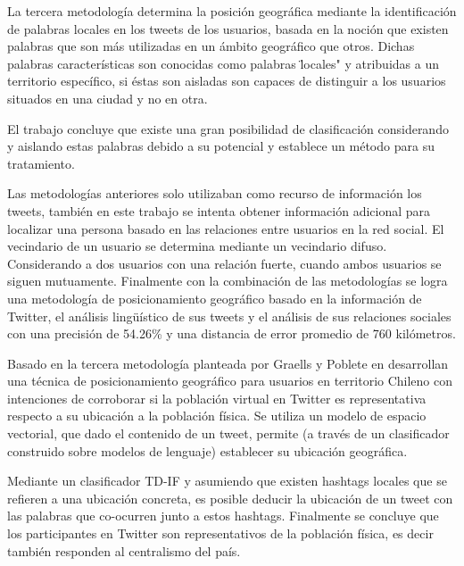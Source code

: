 La tercera metodología determina la posición geográfica mediante la identificación de palabras locales en los tweets de los usuarios, basada en la noción que existen palabras que son más utilizadas en un ámbito geográfico que otros. Dichas palabras características son conocidas como palabras  \"locales" y atribuidas a un territorio específico, si éstas son aisladas son capaces de distinguir a los usuarios situados en una ciudad y no en otra. 

El trabajo concluye que existe una gran posibilidad de clasificación considerando y aislando estas palabras debido a su potencial y establece un método para su tratamiento. 

Las metodologías anteriores solo utilizaban como recurso de información los tweets, también en este trabajo se intenta obtener información adicional para localizar una persona basado en las relaciones entre usuarios en la red social. El vecindario de un usuario se determina mediante un vecindario difuso. Considerando a dos usuarios con una relación fuerte, cuando ambos usuarios se siguen mutuamente. Finalmente con la combinación de las metodologías se logra una metodología de posicionamiento geográfico basado en la información de Twitter, el análisis lingüístico de sus tweets y el análisis de sus relaciones sociales con una precisión de 54.26\% y una distancia de error promedio de 760 kilómetros.

Basado en la tercera metodología planteada por  \cite{Cheng:2010:YYT:1871437.1871535}  Graells y Poblete en \cite{GraellsGarridoP13} desarrollan una técnica de posicionamiento geográfico para usuarios en territorio Chileno con intenciones de corroborar si la población virtual en Twitter es representativa respecto a su ubicación a la población física. Se utiliza un modelo de espacio vectorial, que dado el contenido de un tweet, permite (a través de un clasificador construido sobre modelos de lenguaje) establecer su ubicación geográfica. 

Mediante un clasificador TD-IF y asumiendo que existen hashtags locales que se refieren a una ubicación concreta, es posible deducir la ubicación de un tweet con las palabras que co-ocurren junto a estos hashtags. Finalmente se concluye que los participantes en Twitter son representativos de la población física, es decir también responden al centralismo del país.


